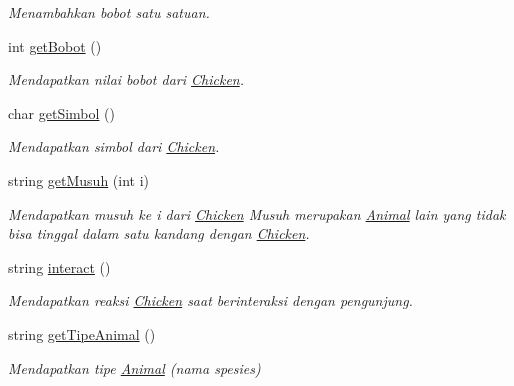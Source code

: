 \begin{DoxyCompactItemize}
\begin{DoxyCompactList}\small\item\em Menambahkan bobot satu satuan. \end{DoxyCompactList}\item 
int \hyperlink{classChicken_a3412b91656f7fbc582e61347d041fc26}{get\-Bobot} ()
\begin{DoxyCompactList}\small\item\em Mendapatkan nilai bobot dari \hyperlink{classChicken}{Chicken}. \end{DoxyCompactList}\item 
char \hyperlink{classChicken_a76ccfbab33c1e7e8586594d5a187f24f}{get\-Simbol} ()
\begin{DoxyCompactList}\small\item\em Mendapatkan simbol dari \hyperlink{classChicken}{Chicken}. \end{DoxyCompactList}\item 
string \hyperlink{classChicken_a3104bf975190b71c598c8a9190cc8e82}{get\-Musuh} (int i)
\begin{DoxyCompactList}\small\item\em Mendapatkan musuh ke i dari \hyperlink{classChicken}{Chicken} Musuh merupakan \hyperlink{classAnimal}{Animal} lain yang tidak bisa tinggal dalam satu kandang dengan \hyperlink{classChicken}{Chicken}. \end{DoxyCompactList}\item 
string \hyperlink{classChicken_a4b257cd1beddc7998245e1a276be9538}{interact} ()
\begin{DoxyCompactList}\small\item\em Mendapatkan reaksi \hyperlink{classChicken}{Chicken} saat berinteraksi dengan pengunjung. \end{DoxyCompactList}\item 
string \hyperlink{classChicken_aed9dc3fbf2e9a352d27109ba331db37d}{get\-Tipe\-Animal} ()
\begin{DoxyCompactList}\small\item\em Mendapatkan tipe \hyperlink{classAnimal}{Animal} (nama spesies) \end{DoxyCompactList}\end{DoxyCompactItemize}
